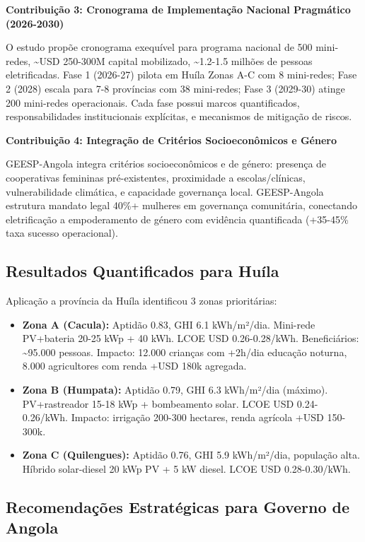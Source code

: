 \documentclass[12pt, a4paper]{article}
\begin{document}
\textbf{Contribuição 3: Cronograma de Implementação Nacional Pragmático (2026-2030)}

O estudo propõe cronograma exequível para programa nacional de 500 mini-redes, \textasciitilde{}USD 250-300M capital mobilizado, \textasciitilde{}1.2-1.5 milhões de pessoas eletrificadas. Fase 1 (2026-27) pilota em Huíla Zonas A-C com 8 mini-redes; Fase 2 (2028) escala para 7-8 províncias com 38 mini-redes; Fase 3 (2029-30) atinge 200 mini-redes operacionais. Cada fase possui marcos quantificados, responsabilidades institucionais explícitas, e mecanismos de mitigação de riscos.

\textbf{Contribuição 4: Integração de Critérios Socioeconômicos e Género}

GEESP-Angola integra critérios socioeconômicos e de género: presença de cooperativas femininas pré-existentes, proximidade a escolas/clínicas, vulnerabilidade climática, e capacidade governança local. GEESP-Angola estrutura mandato legal 40\%+ mulheres em governança comunitária, conectando eletrificação a empoderamento de género com evidência quantificada (+35-45\% taxa sucesso operacional).

\subsection{Resultados Quantificados para Huíla}

Aplicação a província da Huíla identificou 3 zonas prioritárias:

\begin{itemize}
\item \textbf{Zona A (Cacula):} Aptidão 0.83, GHI 6.1 kWh/m²/dia. Mini-rede PV+bateria 20-25 kWp + 40 kWh. LCOE USD 0.26-0.28/kWh. Beneficiários: \textasciitilde{}95.000 pessoas. Impacto: 12.000 crianças com +2h/dia educação noturna, 8.000 agricultores com renda +USD 180k agregada.

\item \textbf{Zona B (Humpata):} Aptidão 0.79, GHI 6.3 kWh/m²/dia (máximo). PV+rastreador 15-18 kWp + bombeamento solar. LCOE USD 0.24-0.26/kWh. Impacto: irrigação 200-300 hectares, renda agrícola +USD 150-300k.

\item \textbf{Zona C (Quilengues):} Aptidão 0.76, GHI 5.9 kWh/m²/dia, população alta. Híbrido solar-diesel 20 kWp PV + 5 kW diesel. LCOE USD 0.28-0.30/kWh.
\end{itemize}

\subsection{Recomendações Estratégicas para Governo de Angola}
\end{document}
